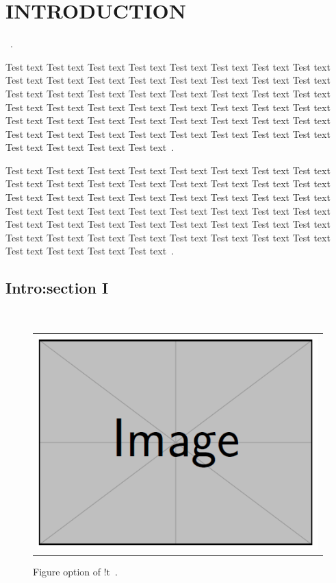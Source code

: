 
\chapter{INTRODUCTION}
\lipsum[1-4]~\cite{anderson1964hard}.

Test text Test text Test text Test text Test text Test text Test text Test text Test text Test text Test text Test text Test text 
Test text Test text Test text Test text Test text Test text Test text Test text Test text Test text Test text Test text Test text 
Test text Test text Test text Test text Test text Test text Test text Test text Test text Test text Test text Test text Test text 
Test text Test text Test text Test text Test text Test text Test text Test text Test text Test text Test text Test text Test text~\cite{khalil2012analysis}.

Test text Test text Test text Test text Test text Test text Test text Test text Test text Test text Test text Test text Test text 
Test text Test text Test text Test text Test text Test text Test text Test text Test text Test text Test text Test text Test text 
Test text Test text Test text Test text Test text Test text Test text Test text Test text Test text Test text Test text Test text 
Test text Test text Test text Test text Test text Test text Test text Test text Test text Test text Test text Test text Test text~\cite{sage2015study}.

\section{Intro:section I}
\lipsum[1-4]~\cite{anderson1964hard}

\begin{figure}[!t]
	{
	\begin{center}
		\begin{tabular}{c}
			\includegraphics[width=0.9\linewidth]{dummy.png}
		\end{tabular}
	\end{center}
	}
	\caption[dummy image FIXME1]{Figure option of $!\text{t}$~\cite{chen2014fabrication}.}
\label{dummy_img1}
\end{figure}

